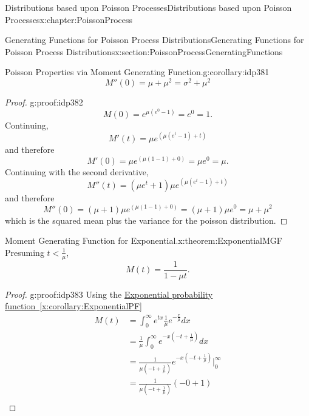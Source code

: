 \documentclass[oneside,10pt,]{book}
\newcommand{\xreffont}{\relax}
\numberwithin{equation}{section}
\newcommand{\lt}{<}
\begin{document}
\begin{chapterptx}{Distributions based upon Poisson Processes}{}{Distributions based upon Poisson Processes}{}{}{x:chapter:PoissonProcess}
\begin{sectionptx}{Generating Functions for Poisson Process Distributions}{}{Generating Functions for Poisson Process Distributions}{}{}{x:section:PoissonProcessGeneratingFunctions}
\begin{corollary}{Poisson Properties via Moment Generating Function.}{}{g:corollary:idp381}
%
\begin{equation*}
M''(0) = \mu + \mu^2 = \sigma^2 + \mu^2
\end{equation*}
%
\end{corollary}
\begin{proof}{}{g:proof:idp382}
%
\begin{equation*}
M(0) = e^{\mu \left ( e^0 - 1 \right )} = e^0 = 1.
\end{equation*}
Continuing,%
\begin{equation*}
M'(t) = \mu e^{\left(\mu {\left(e^{t} - 1\right)} + t\right)}
\end{equation*}
and therefore%
\begin{equation*}
M'(0) = \mu e^{\left(\mu {\left(1 - 1\right)} + 0\right)} = \mu e^0 = \mu.
\end{equation*}
Continuing with the second derivative,%
\begin{equation*}
M''(t) = {\left(\mu e^{t} + 1\right)} \mu e^{\left(\mu {\left(e^{t} - 1\right)} + t\right)}
\end{equation*}
and therefore%
\begin{equation*}
M''(0) = {\left(\mu + 1\right)} \mu e^{\left(\mu {\left(1 - 1\right)} + 0\right)} = {\left(\mu + 1\right)} \mu e^0 = \mu + \mu^2 
\end{equation*}
which is the squared mean plus the variance for the poisson distribution.%
\end{proof}
\begin{theorem}{Moment Generating Function for Exponential.}{}{x:theorem:ExponentialMGF}%
Presuming \(t \lt \frac{1}{\mu}\),%
\begin{equation*}
M(t) = \frac{1}{1-\mu t}.
\end{equation*}
%
\end{theorem}
\begin{proof}{}{g:proof:idp383}
Using the \hyperref[x:corollary:ExponentialPF]{Exponential probability function~{\xreffont\ref{x:corollary:ExponentialPF}}}%
\begin{align*}
M(t) & = \int_0^{\infty} e^{tx} \frac{1}{\mu} e^{-\frac{x}{\mu}} dx\\
& = \frac{1}{\mu} \int_0^{\infty} e^{- x \left ( -t + \frac{1}{\mu} \right ) } dx\\
& =  \frac{1}{\mu \left(-t + \frac{1}{\mu} \right )}  e^{- x \left ( -t + \frac{1}{\mu} \right ) } \big |_0^{\infty}\\
& =  \frac{1}{\mu \left(-t + \frac{1}{\mu} \right )}  \left ( -0 + 1 \right )\\

\end{align*}
\end{proof}
\end{sectionptx}
\end{chapterptx}
\end{document}

